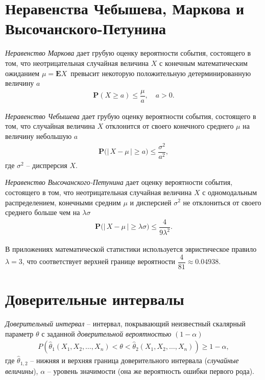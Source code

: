 \documentclass[%
	11pt,
	a4paper,
	utf8,
		]{article}
\begin{document}
\section{Неравенства Чебышева, Маркова и Высочанского-Петунина}

\emph{Неравенство Маркова} дает грубую оценку вероятности события, состоящего в том, что неотрицательная случайная величина $ X $ с конечным математическим ожиданием $ \mu = \mathbf{E}X $ превысит некоторую положительную детерминированную величину $ a $
\begin{align*}
	\mathbf{P}(X \geqslant a) \leqslant \dfrac{\mu}{a}, \quad a > 0.
\end{align*}

\emph{Неравенство Чебышева} дает грубую оценку вероятности события, состоящего в том, что случайная величина $ X $ отклонится от своего конечного среднего $ \mu $ на величину небольшую $ a $ 
\begin{align*}
	\mathbf{P}\big(|\,X - \mu\,| \geqslant a\big) \leqslant \dfrac{\sigma^2}{a^2},
\end{align*}
где $ \sigma^2 $ -- диспрерсия $ X $.

\emph{Неравенство Высочанского-Петунина} дает оценку вероятности события, состоящего в том, что неотрицательная случайная величина $ X $ с одномодальным распределением, конечными средним $ \mu $ и дисперсией $ \sigma^2 $ не отклониться от своего среднего больше чем на $ \lambda \sigma $
\begin{align*}
	\mathbf{P} \big( |\,X - \mu\,| \geqslant \lambda \sigma \big) \leqslant \dfrac{4}{9 \lambda^2}.
\end{align*}

В приложениях математической статистики используется эвристическое правило $ \lambda = 3 $, что соответствует верхней границе вероятности $ \dfrac{4}{81} \approx 0.04938 $.


\section{Доверительные интервалы}

\emph{Доверительный интервал} -- интервал, покрывающий неизвестный скалярный параметр $ \theta $ с заданной \emph{доверительной вероятностью} $ (1 - \alpha) $
\begin{align*}
	P(\hat{\theta}_1(X_1, X_2, \dots, X_n) < \theta < \hat{\theta}_2(X_1, X_2, \dots, X_n)) \geqslant 1 - \alpha,
\end{align*}
где $ \hat{\theta}_{1,2} $ -- нижняя и верхняя граница доверительного интервала (\emph{случайные величины}), $ \alpha $ -- уровень значимости (она же вероятность ошибки первого рода).
\end{document}
